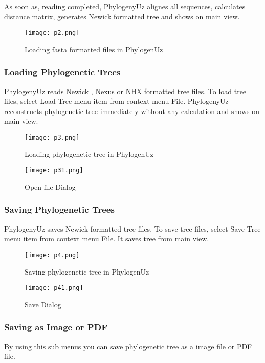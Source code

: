 As soon as, reading completed, PhylogenyUz alignes all sequences,
calculates distance matrix, generates Newick formatted tree and 
shows on main view.

\begin{figure}[!htbp] 
  \center
  \texttt{[image: p2.png]}
  \caption[w]{Loading fasta formatted files in PhylogenUz} 
  \label{img:p2}  
\end{figure}

\subsubsection{Loading Phylogenetic Trees}
PhylogenyUz reads Newick \cite{newick}, Nexus or NHX formatted tree files.
To load tree files, select Load Tree menu item from context menu File.
PhylogenyUz reconstructs phylogenetic tree immediately without 
any calculation and shows on main view.

\begin{figure}[!htbp] 
  \center
  \texttt{[image: p3.png]}
  \caption[w]{Loading phylogenetic tree in PhylogenUz} 
  \label{img:p3}  
\end{figure}

\begin{figure}[!htbp] 
  \center
  \texttt{[image: p31.png]}
  \caption[w]{Open file Dialog} 
  \label{img:p31}  
\end{figure}

\subsubsection{Saving Phylogenetic Trees}
PhylogenyUz saves Newick \cite{newick} formatted tree files.
To save tree files, select Save Tree menu item from context menu File.
It saves tree from main view.  

\begin{figure}[!htbp] 
  \center
  \texttt{[image: p4.png]}
  \caption[w]{Saving phylogenetic tree in PhylogenUz} 
  \label{img:p4}  
\end{figure}

\begin{figure}[!htbp] 
  \center
  \texttt{[image: p41.png]}
  \caption[w]{Save Dialog} 
  \label{img:p41}  
\end{figure}

\subsubsection{Saving as Image or PDF}
By using this sub menus you can save 
phylogenetic tree as a image file or PDF file.
 
